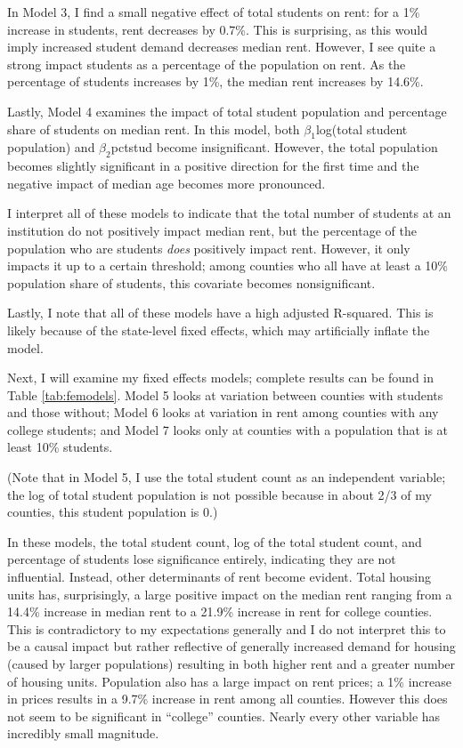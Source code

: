 \documentclass[12pt,english]{article}
\begin{document}
In Model 3, I find a small negative effect of total students on rent: for a 1\% increase in students, rent decreases by 0.7\%. This is surprising, as this would imply increased student demand decreases median rent. However, I see quite a strong impact students as a percentage of the population on rent. As the percentage of students increases by 1\%, the median rent increases by 14.6\%. 

Lastly, Model 4 examines the impact of total student population and percentage share of students on median rent. In this model, both $\beta_1$log(total student population) and $\beta_2$pctstud become insignificant. However, the total population becomes slightly significant in a positive direction for the first time and the negative impact of median age becomes more pronounced. 

I interpret all of these models to indicate that the total number of students at an institution do not positively impact median rent, but the percentage of the population who are students \textit{does} positively impact rent. However, it only impacts it up to a certain threshold; among counties who all have at least a 10\% population share of students, this covariate becomes nonsignificant.

Lastly, I note that all of these models have a high adjusted R-squared. This is likely because of the state-level fixed effects, which may artificially inflate the model.

Next, I will examine my fixed effects models; complete results can be found in Table \ref{tab:femodels}. Model 5 looks at variation between counties with students and those without; Model 6 looks at variation in rent among counties with any college students; and Model 7 looks only at counties with a population that is at least 10\% students. 

(Note that in Model 5, I use the total student count as an independent variable; the log of total student population is not possible because in about 2/3 of my counties, this student population is 0.)

In these models, the total student count, log of the total student count, and percentage of students lose significance entirely, indicating they are not influential. Instead, other determinants of rent become evident. Total housing units has, surprisingly, a large positive impact on the median rent ranging from a 14.4\% increase in median rent to a 21.9\% increase in rent for college counties. This is contradictory to my expectations generally and I do not interpret this to be a causal impact but rather reflective of generally increased demand for housing (caused by larger populations) resulting in both higher rent and a greater number of housing units. Population also has a large impact on rent prices; a 1\% increase in prices results in a 9.7\% increase in rent among all counties. However this does not seem to be significant in ``college'' counties. Nearly every other variable has incredibly small magnitude.
\end{document}
